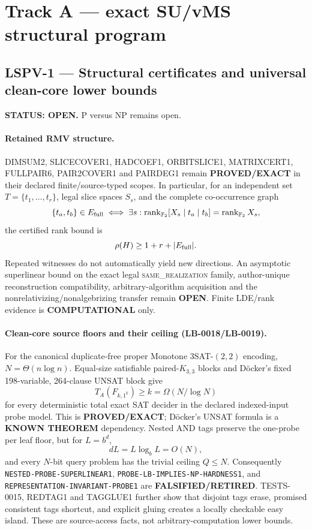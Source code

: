 \documentclass[11pt]{article}
\begin{document}
\section{Track A --- exact SU/vMS structural program}

\subsection{LSPV-1 --- Structural certificates and universal clean-core lower bounds}

\textbf{STATUS: OPEN.} P versus NP remains open.

\paragraph{Retained RMV structure.}
DIMSUM2, SLICECOVER1, HADCOEF1, ORBITSLICE1, MATRIXCERT1,
FULLPAIR6, PAIR2COVER1 and PAIRDEG1 remain \textbf{PROVED/EXACT} in their
declared finite/source-typed scopes.  In particular, for an independent
set \(T=\{t_1,\ldots,t_r\}\), legal slice spaces \(S_s\), and the complete
co-occurrence graph
\[
 \{t_a,t_b\}\in E_{\rm full}\iff
 \exists s:\operatorname{rank}_{\mathbb F_2}[X_s\mid t_a\mid t_b]
 =\operatorname{rank}_{\mathbb F_2}X_s,
\]
the certified rank bound is
\[
 \rho(H)\ge 1+r+|E_{\rm full}|.
\]
Repeated witnesses do not automatically yield new directions.  An
asymptotic superlinear bound on the exact legal \textsc{same\_realization}
family, author-unique reconstruction compatibility, arbitrary-algorithm
acquisition and the nonrelativizing/nonalgebrizing transfer remain
\textbf{OPEN}.  Finite LDE/rank evidence is \textbf{COMPUTATIONAL} only.

\paragraph{Clean-core source floors and their ceiling (LB-0018/LB-0019).}
For the canonical duplicate-free proper Monotone \(3\)SAT-\((2,2)\) encoding,
\(N=\Theta(n\log n)\).  Equal-size satisfiable paired-\(K_{3,3}\) blocks and
D\"ocker's fixed 198-variable, 264-clause UNSAT block give
\[
 T_A(F_{k,1^k})\ge k=\Omega(N/\log N)
\]
for every deterministic total exact SAT decider in the declared indexed-input
probe model.  This is \textbf{PROVED/EXACT}; D\"ocker's UNSAT formula is a
\textbf{KNOWN THEOREM} dependency.  Nested AND tags preserve the one-probe
per leaf floor, but for \(L=b^d\),
\[
 dL=L\log_bL=O(N),
\]
and every \(N\)-bit query problem has the trivial ceiling \(Q\le N\).
Consequently \texttt{NESTED-PROBE-SUPERLINEAR1},
\texttt{PROBE-LB-IMPLIES-NP-HARDNESS1}, and
\texttt{REPRESENTATION-INVARIANT-PROBE1} are
\textbf{FALSIFIED/RETIRED}.  TESTS-0015, REDTAG1 and TAGGLUE1 further show
that disjoint tags erase, promised consistent tags shortcut, and explicit
gluing creates a locally checkable easy island.  These are source-access
facts, not arbitrary-computation lower bounds.
\end{document}
